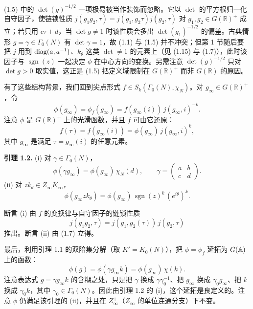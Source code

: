 \begin{annote}
(1.5) 中的 $\det(g)^{-1/2}$ 一项极易被当作装饰而忽略。它以 $\det$ 的平方根归一化自守因子，使链锁性质 $j(g_1g_2,\tau)=j(g_1,g_2\tau)j(g_2,\tau)$ 对 $g_1,g_2\in G(\mathbb{R})^+$ 成立；若只用 $c\tau+d$，当 $\det g\ne1$ 时该性质会多出 $\det(g_1)^{-1/2}$ 的偏差。古典情形 $g=\gamma\in\Gamma_0(N)$ 有 $\det\gamma=1$，故 (1.1) 与 (1.5) 并不冲突；但第 1 节随后要把 $j$ 用到 $\operatorname{diag}(a,a^{-1})$、$k_\theta$ 这类 $\det\ne1$ 的元素上（见 (1.15) 与 (1.7)），此时该因子与 $\operatorname{sgn}(z)$ 一起决定 $\phi$ 在中心方向的变换。另需注意 $\det(g)^{-1/2}$ 只对 $\det g>0$ 取实值，这正是 (1.5) 把定义域限制在 $G(\mathbb{R})^+$ 而非 $G(\mathbb{R})$ 的原因。

\par\vspace{0.15em}{\raggedleft 【来源：Bump《Automorphic Forms and Representations》第 1、2 章；Shimura《Introduction to the Arithmetic Theory of Automorphic Forms》第 1 章（A）】\par}
\end{annote}

有了这些结构背景，我们回到尖点形式 $f\in S_k(\Gamma_0(N),\chi_N)$。对 $g_\infty\in G(\mathbb{R})^+$，令
\begin{equation*}\tag{1.8}
\phi(g_\infty)=\phi_f(g_\infty)=f(g_\infty(i))\,j(g_\infty,i)^{-k}.
\end{equation*}
注意 $\phi$ 是 $G(\mathbb{R})^+$ 上的光滑函数，并且 $f$ 可由它还原：
\begin{equation*}\tag{1.9}
f(\tau)=f(g_\infty(i))=\phi(g_\infty)\,j(g_\infty,i)^{k},
\end{equation*}
其中 $g_\infty$ 是满足 $\tau=g_\infty(i)$ 的任意元素。

\medskip\noindent\textbf{引理 1.2.}\quad
(i) 对 $\gamma\in\Gamma_0(N)$，
\[
\phi(\gamma g_\infty)=\phi(g_\infty)\,\chi_N(d),\qquad \gamma=\begin{pmatrix}a&b\\c&d\end{pmatrix}.
\]
(ii) 对 $zk_\theta\in Z_\infty K_\infty$，
\[
\phi(g_\infty zk_\theta)=\phi(g_\infty)\,\operatorname{sgn}(z)^k\,(e^{i\theta})^k.
\]

\medskip
断言 (i) 由 $f$ 的变换律与自守因子的链锁性质
\[
j(g_1g_2,\tau)=j(g_1,g_2(\tau))\,j(g_2,\tau)
\]
推出。断言 (ii) 由 (1.7) 立得。

最后，利用引理 1.1 的双陪集分解（取 $K'=K_0(N)$），把 $\phi=\phi_f$ 延拓为 $G(\mathbb{A})$ 上的函数：
\begin{equation*}\tag{1.10}
\phi(g)=\phi(\gamma g_\infty k)=\phi(g_\infty)\,\chi(k).
\end{equation*}
注意表达式 $g=\gamma g_\infty k$ 的含糊之处，只是把 $\gamma$ 换成 $\gamma\gamma_0^{-1}$、把 $g_\infty$ 换成 $\gamma_0g_\infty$、把 $k$ 换成 $\gamma_0k$，其中 $\gamma_0\in\Gamma_0(N)$。因此由引理 1.2 的 (i)，这个延拓是良定义的。注意 $\phi$ 仍满足该引理的 (ii)，并且在 $Z_\infty^+$（$Z_\infty$ 的单位连通分支）下不变。

